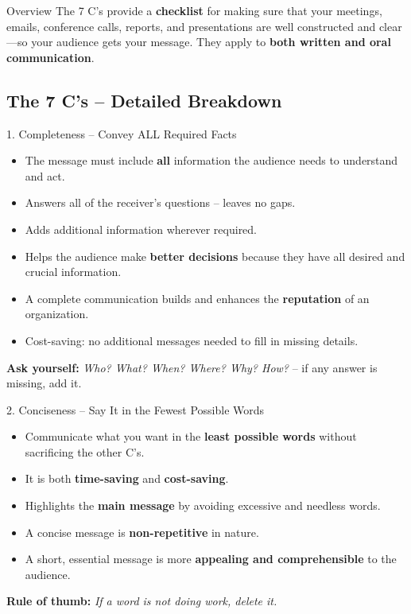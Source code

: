 \documentclass[12pt,a4paper]{article}
\begin{document}
\begin{keybox}{Overview}
The 7 C's provide a \textbf{checklist} for making sure that your meetings, emails, conference calls, reports, and presentations are well constructed and clear---so your audience gets your message. They apply to \textbf{both written and oral communication}.
\end{keybox}

\subsection{The 7 C's -- Detailed Breakdown}

\begin{keybox}{1. Completeness -- Convey ALL Required Facts}
\begin{itemize}[noitemsep]
    \item The message must include \textbf{all} information the audience needs to understand and act.
    \item Answers all of the receiver's questions -- leaves no gaps.
    \item Adds additional information wherever required.
    \item Helps the audience make \textbf{better decisions} because they have all desired and crucial information.
    \item A complete communication builds and enhances the \textbf{reputation} of an organization.
    \item Cost-saving: no additional messages needed to fill in missing details.
\end{itemize}
\textbf{Ask yourself:} \textit{Who? What? When? Where? Why? How?} -- if any answer is missing, add it.
\end{keybox}

\begin{keybox}{2. Conciseness -- Say It in the Fewest Possible Words}
\begin{itemize}[noitemsep]
    \item Communicate what you want in the \textbf{least possible words} without sacrificing the other C's.
    \item It is both \textbf{time-saving} and \textbf{cost-saving}.
    \item Highlights the \textbf{main message} by avoiding excessive and needless words.
    \item A concise message is \textbf{non-repetitive} in nature.
    \item A short, essential message is more \textbf{appealing and comprehensible} to the audience.
\end{itemize}
\textbf{Rule of thumb:} \textit{If a word is not doing work, delete it.}
\end{keybox}
\end{document}
